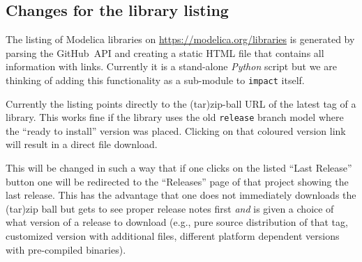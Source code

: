 \documentclass[11pt,a4paper,twocolumn]{article}
\newcommand{\code}[1]{\texttt{#1}} %
\begin{document}
\subsection{Changes for the library listing}
The listing of Modelica libraries on
\url{https://modelica.org/libraries} is generated by parsing the
GitHub~API and creating a static HTML file that contains all
information with links. Currently it is a stand-alone \emph{Python}
script but we are thinking of adding this functionality as a
sub-module to \code{impact} itself.

Currently the listing points directly to the (tar)zip-ball URL of the
latest tag of a library. This works fine if the library uses the old
\texttt{release} branch model where the ``ready to install'' version
was placed.  Clicking on that coloured version link will result in a
direct file download.

This will be changed in such a way that if one clicks on the listed
``Last Release'' button one will be redirected to the ``Releases''
page of that project showing the last release. This has the advantage
that one does not immediately downloads the (tar)zip ball but gets to
see proper release notes first \emph{and} is given a choice of what
version of a release to download (e.g., pure source distribution of
that tag, customized version with additional files, different platform
dependent versions with pre-compiled binaries).
\end{document}
